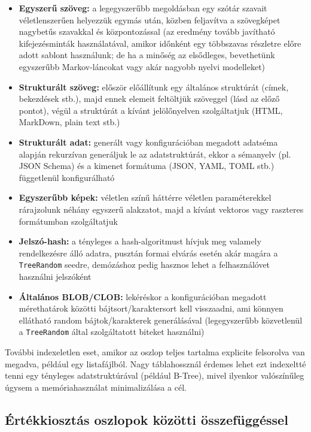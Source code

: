 \documentclass[
    parspace,
    noindent,
    nohyp,
]{elteiktdk}[2023/04/10]
\begin{document}
\begin{itemize}
  \item \textbf{Egyszerű szöveg:}
    a legegyszerűbb megoldásban egy szótár szavait véletlenszerűen helyezzük egymás után,
    közben feljavítva a szövegképet nagybetűs szavakkal és központozással
    (az eredmény tovább javítható kifejezésminták használatával,
    amikor időnként egy többszavas részletre előre adott sablont használunk;
    de ha a minőség az elsődleges, bevethetünk egyszerűbb Markov-láncokat\cite{Artut2019UsingAM}
    vagy akár nagyobb nyelvi modelleket)
  \item \textbf{Strukturált szöveg:}
    először előállítunk egy általános struktúrát (címek, bekezdések stb.),
    majd ennek elemeit feltöltjük szöveggel (lásd az előző pontot),
    végül a struktúrát a kívánt jelölőnyelven szolgáltatjuk (HTML, MarkDown, plain text stb.)
  \item \textbf{Strukturált adat:}
    generált vagy konfigurációban megadott adatséma alapján rekurzívan generáljuk le az adatstruktúrát,
    ekkor a sémanyelv (pl. JSON Schema) és a kimenet formátuma (JSON, YAML, TOML stb.)
    függetlenül konfigurálható
  \item \textbf{Egyszerűbb képek:}
    véletlen színű háttérre véletlen paraméterekkel
    rárajzolunk néhány egyszerű alakzatot,
    majd a kívánt vektoros vagy raszteres formátumban szolgáltatjuk
  \item \textbf{Jelszó-hash:}
    a tényleges a hash-algoritmust hívjuk meg valamely rendelkezésre álló adatra,
    pusztán formai elvárás esetén akár magára a \texttt{TreeRandom} seedre,
    demózáshoz pedig hasznos lehet a felhasználóvet használni jelszóként
  \item \textbf{Általános BLOB/CLOB:}
    lekéréskor a konfigurációban megadott mérethatárok közötti bájtsort/karaktersort kell visszaadni,
    ami könnyen ellátható random bájtok/karakterek generálásával
    (legegyszerűbb közvetlenül a \texttt{TreeRandom} által szolgáltatott biteket használni)
\end{itemize}

További indexeletlen eset, amikor az oszlop teljes tartalma explicite felsorolva van megadva,
például egy listafájlból.
Nagy táblahossznál érdemes lehet ezt indexeltté tenni egy tényleges adatstruktúrával (például B-Tree),
mivel ilyenkor valószínűleg úgysem a memóriahasználat minimalizálása a cél.

\subsection{Értékkiosztás oszlopok közötti összefüggéssel}
\end{document}
